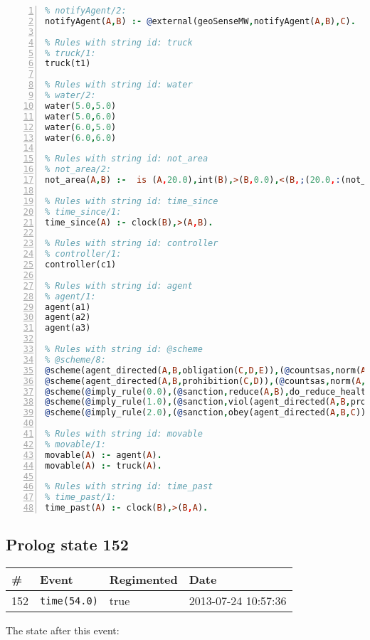 \documentclass[11pt]{article}\usepackage[utf8]{inputenc}\usepackage{geometry}
\begin{document}
\begin{lstlisting}[language=Prolog, numbers=left]
% Rules with string id: notifyAgent
% notifyAgent/2:
notifyAgent(A,B) :- @external(geoSenseMW,notifyAgent(A,B),C).

% Rules with string id: truck
% truck/1:
truck(t1)

% Rules with string id: water
% water/2:
water(5.0,5.0)
water(5.0,6.0)
water(6.0,5.0)
water(6.0,6.0)

% Rules with string id: not_area
% not_area/2:
not_area(A,B) :-  is (A,20.0),int(B),>(B,0.0),<(B,;(20.0,:(not_area(A,B), is (-(B),20.0)))),int(A),>(A,0.0),<(A,;(20.0,:(area(A,B),-(int(A))))),int(B),>(A,0.0),>(B,0.0),<(A,21.0),<(B,21.0).

% Rules with string id: time_since
% time_since/1:
time_since(A) :- clock(B),>(A,B).

% Rules with string id: controller
% controller/1:
controller(c1)

% Rules with string id: agent
% agent/1:
agent(a1)
agent(a2)
agent(a3)

% Rules with string id: @scheme
% @scheme/8:
@scheme(agent_directed(A,B,obligation(C,D,E)),(@countsas,norm(A,B,F,obligation(C,D,E)),F),false,(listTrue(C)),(time_past(D)),false,[plus(viol(agent_directed(A,B,obligation(C,D,E))))|[]],[plus(obey(agent_directed(A,B,obligation(C,D,E))))|[]])
@scheme(agent_directed(A,B,prohibition(C,D)),(@countsas,norm(A,B,E,prohibition(C,D)),E),(listTrue(C)),false,(false),false,[plus(viol(agent_directed(A,B,prohibition(C,D))))|[]],[plus(obey(agent_directed(A,B,prohibition(C,D))))|[]])
@scheme(@imply_rule(0.0),(@sanction,reduce(A,B),do_reduce_health(A,B),notifyAgent(A,changed(status))),true,false,false,false,[min(reduce(A,B))|[]],[])
@scheme(@imply_rule(1.0),(@sanction,viol(agent_directed(A,B,prohibition(C,D))),do_sanction(D)),true,false,false,false,[min(viol(agent_directed(A,B,prohibition(C,D))))|[]],[])
@scheme(@imply_rule(2.0),(@sanction,obey(agent_directed(A,B,C))),true,false,false,false,[min(obey(agent_directed(A,B,C)))|[]],[])

% Rules with string id: movable
% movable/1:
movable(A) :- agent(A).
movable(A) :- truck(A).

% Rules with string id: time_past
% time_past/1:
time_past(A) :- clock(B),>(B,A).

\end{lstlisting}
\clearpage 
\subsection{Prolog state 152}
\begin{table}[ht]
\centering 
\begin{tabular}{l l l l} 
\textbf{\#} & \textbf{Event} & \textbf{Regimented} & \textbf{Date} \\ [0.5ex] 
\hline
152&\texttt{time(54.0)}&true&2013-07-24 10:57:36\\ [1ex] \hline\end{tabular}
\end{table}
The state after this event:
\end{document}
